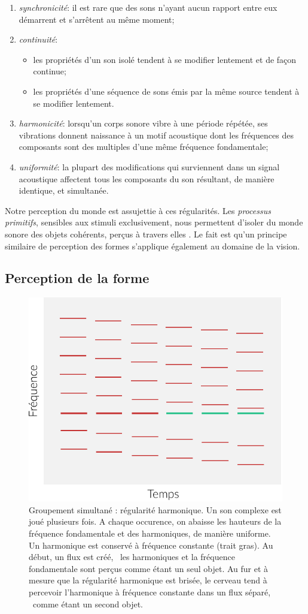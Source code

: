 {\begin{enumerate}
\item \emph{synchronicité}: il est rare que des sons n'ayant aucun rapport entre eux démarrent et s'arrêtent au même moment;
\item \emph{continuité}: 
\begin{itemize}
\item les propriétés d'un son isolé tendent à se modifier lentement et de façon continue;
\item les propriétés d'une séquence de sons émis par la même source tendent à se modifier lentement.
\end{itemize}
\item \emph{harmonicité}: lorsqu'un corps sonore vibre à une période répétée, ses vibrations donnent naissance à un motif acoustique dont les fréquences des composants sont des multiples d'une même fréquence fondamentale;
\item \emph{uniformité}: la plupart des modifications qui surviennent dans un signal acoustique affectent tous les composants du son résultant, de manière identique, et simultanée.
\end{enumerate}

Notre perception du monde est assujettie à ces régularités. 
Les \emph{processus primitifs}, sensibles aux stimuli exclusivement, nous permettent d'isoler du monde sonore des objets cohérents, perçus à travers elles \citep{ballas1987interpreting}. Le fait est qu'un principe similaire de perception des formes s'applique également au domaine de la vision.

\subsection{Perception de la forme}

\begin{figure}[t]
        \myfloatalign
        \includegraphics[width=.5\linewidth]{gfx/ch_3/harmo}
        \caption[Groupement simultané : régularité harmonique]{Groupement simultané : régularité harmonique. Un son complexe est joué plusieurs fois. A chaque occurence, on abaisse les hauteurs de la fréquence fondamentale et des harmoniques, de manière uniforme. Un harmonique est conservé à fréquence constante (trait gras). Au début, un flux est créé, \ie~les harmoniques et la fréquence fondamentale sont perçus comme étant un seul objet. Au fur et à mesure que la régularité harmonique est brisée, le cerveau tend à percevoir l'harmonique à fréquence constante dans un flux séparé, \ie~comme étant un second objet.}\label{fig:harmo}
\end{figure}

}
